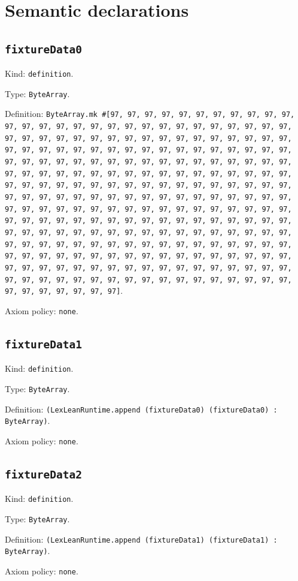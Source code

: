 \documentclass[11pt]{article}
\begin{document}
\section*{Semantic declarations}
\subsection*{\texttt{fixtureData0}}
\noindent Kind: \texttt{definition}.\par
\noindent Type: \texttt{ByteArray}.\par
\noindent Definition: \texttt{ByteArray.mk \#[97, 97, 97, 97, 97, 97, 97, 97, 97, 97, 97, 97, 97, 97, 97, 97, 97, 97, 97, 97, 97, 97, 97, 97, 97, 97, 97, 97, 97, 97, 97, 97, 97, 97, 97, 97, 97, 97, 97, 97, 97, 97, 97, 97, 97, 97, 97, 97, 97, 97, 97, 97, 97, 97, 97, 97, 97, 97, 97, 97, 97, 97, 97, 97, 97, 97, 97, 97, 97, 97, 97, 97, 97, 97, 97, 97, 97, 97, 97, 97, 97, 97, 97, 97, 97, 97, 97, 97, 97, 97, 97, 97, 97, 97, 97, 97, 97, 97, 97, 97, 97, 97, 97, 97, 97, 97, 97, 97, 97, 97, 97, 97, 97, 97, 97, 97, 97, 97, 97, 97, 97, 97, 97, 97, 97, 97, 97, 97, 97, 97, 97, 97, 97, 97, 97, 97, 97, 97, 97, 97, 97, 97, 97, 97, 97, 97, 97, 97, 97, 97, 97, 97, 97, 97, 97, 97, 97, 97, 97, 97, 97, 97, 97, 97, 97, 97, 97, 97, 97, 97, 97, 97, 97, 97, 97, 97, 97, 97, 97, 97, 97, 97, 97, 97, 97, 97, 97, 97, 97, 97, 97, 97, 97, 97, 97, 97, 97, 97, 97, 97, 97, 97, 97, 97, 97, 97, 97, 97, 97, 97, 97, 97, 97, 97, 97, 97, 97, 97, 97, 97, 97, 97, 97, 97, 97, 97, 97, 97, 97, 97, 97, 97, 97, 97, 97, 97, 97, 97, 97, 97, 97, 97, 97, 97, 97, 97, 97, 97, 97, 97, 97, 97, 97, 97, 97, 97]}.\par
\noindent Axiom policy: \texttt{none}.\par
\subsection*{\texttt{fixtureData1}}
\noindent Kind: \texttt{definition}.\par
\noindent Type: \texttt{ByteArray}.\par
\noindent Definition: \texttt{(LexLeanRuntime.append (fixtureData0) (fixtureData0) : ByteArray)}.\par
\noindent Axiom policy: \texttt{none}.\par
\subsection*{\texttt{fixtureData2}}
\noindent Kind: \texttt{definition}.\par
\noindent Type: \texttt{ByteArray}.\par
\noindent Definition: \texttt{(LexLeanRuntime.append (fixtureData1) (fixtureData1) : ByteArray)}.\par
\noindent Axiom policy: \texttt{none}.\par
\end{document}
